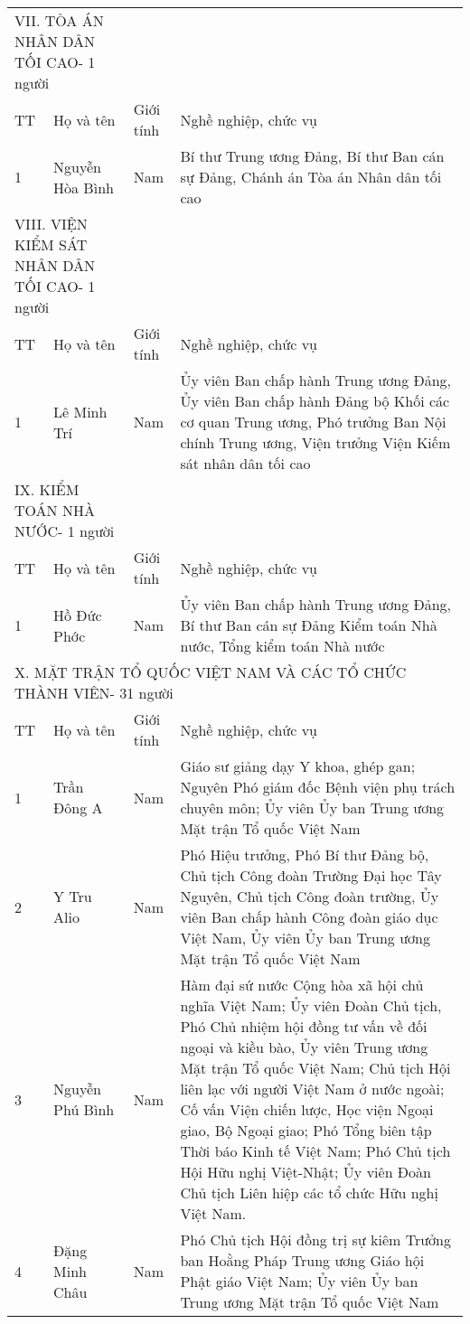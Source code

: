 \begin{longtable}{p{}p{}p{}p{}}
\multicolumn{2}{l}{VII. TÒA ÁN NHÂN DÂN TỐI CAO- 1 người} &
 &
 \\
TT &
  Họ và tên &
  Giới tính &
  Nghề nghiệp, chức vụ \\
1 &
  Nguyễn Hòa Bình &
  Nam &
  Bí thư Trung ương Đảng, Bí thư Ban cán sự Đảng, Chánh án Tòa án Nhân dân tối cao \\
\multicolumn{2}{l}{VIII. VIỆN KIỂM SÁT NHÂN DÂN TỐI CAO- 1 người} &
 &
 \\
TT &
  Họ và tên &
  Giới tính &
  Nghề nghiệp, chức vụ \\
1 &
  Lê Minh Trí &
  Nam &
  Ủy viên Ban chấp hành Trung ương Đảng, Ủy viên Ban chấp hành Đảng bộ Khối các cơ quan Trung ương, Phó trưởng Ban Nội chính Trung ương, Viện trưởng Viện Kiếm sát nhân dân tối cao \\
\multicolumn{2}{l}{IX. KIỂM TOÁN NHÀ NƯỚC- 1 người} &
 &
 \\
TT &
  Họ và tên &
  Giới tính &
  Nghề nghiệp, chức vụ \\
1 &
  Hồ Đức Phớc &
  Nam &
  Ủy viên Ban chấp hành Trung ương Đảng, Bí thư Ban cán sự Đảng Kiểm toán Nhà nước, Tổng kiểm toán Nhà nước \\
\multicolumn{4}{l}{X. MẶT TRẬN TỔ QUỐC VIỆT NAM VÀ CÁC TỔ CHỨC THÀNH VIÊN- 31 người} \\
TT &
  Họ và tên &
  Giới tính &
  Nghề nghiệp, chức vụ \\
1 &
  Trần Đông A &
  Nam &
  Giáo sư giảng dạy Y khoa, ghép gan; Nguyên Phó giám đốc Bệnh viện phụ trách chuyên môn; Ủy viên Ủy ban Trung ương Mặt trận Tổ quốc Việt Nam \\
2 &
  Y Tru Alio &
  Nam &
  Phó Hiệu trưởng, Phó Bí thư Đảng bộ, Chủ tịch Công đoàn Trường Đại học Tây Nguyên, Chủ tịch Công đoàn trường, Ủy viên Ban chấp hành Công đoàn giáo dục Việt Nam, Ủy viên Ủy ban Trung ương Mặt trận Tổ quốc Việt Nam \\
3 &
  Nguyễn Phú Bình &
  Nam &
  Hàm đại sứ nước Cộng hòa xã hội chủ nghĩa Việt Nam; Ủy viên Đoàn Chủ tịch, Phó Chủ nhiệm hội đồng tư vấn về đối ngoại và kiều bào, Ủy viên Trung ương Mặt trận Tổ quốc Việt Nam; Chủ tịch Hội liên lạc với người Việt Nam ở nước ngoài; Cố vấn Viện chiến lược, Học viện Ngoại giao, Bộ Ngoại giao; Phó Tổng biên tập Thời báo Kinh tế Việt Nam; Phó Chủ tịch Hội Hữu nghị Việt-Nhật; Ủy viên Đoàn Chủ tịch Liên hiệp các tổ chức Hữu nghị Việt Nam. \\
4 &
  Đặng Minh Châu &
  Nam &
  Phó Chủ tịch Hội đồng trị sự kiêm Trưởng ban Hoằng Pháp Trung ương Giáo hội Phật giáo Việt Nam; Ủy viên Ủy ban Trung ương Mặt trận Tổ quốc Việt Nam \\

\end{longtable}

